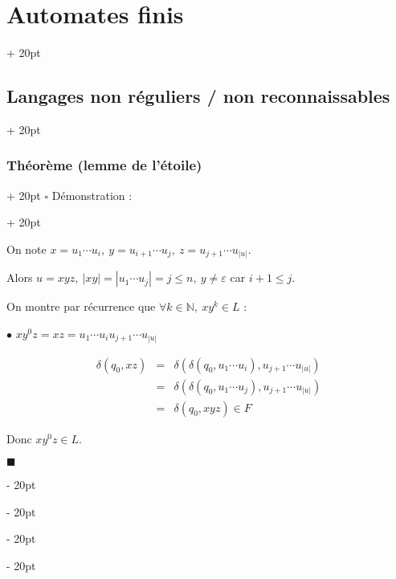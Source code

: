 \documentclass[a4paper, 12pt, twoside]{article}
\newcommand{\N}{\mathbb{N}} %
\newcommand{\abs}[1]{\left\lvert #1 \right\rvert}
\renewcommand{\le}{\leqslant}
\newcommand{\ind}[1][20pt]{\advance\leftskip + #1}
\newcommand{\deind}[1][20pt]{\advance\leftskip - #1}
\newenvironment{indt}[2][20pt]{#2 \par \ind[#1]}{\par \deind} %
\newenvironment{proof}[1][{Démonstration :}]{\begin{indt}{$\square$ #1}}{$\blacksquare$ \end{indt}}
\begin{document}
\begin{indt}{\section{Automates finis}}
\begin{indt}{\subsection{Langages non réguliers / non reconnaissables}}
\begin{indt}{\subsubsection{Théorème (lemme de l'étoile)}}
\begin{proof}
\begin{center}
                    \end{center}

                    On note $x = u_1 \cdots u_i,\ y = u_{i + 1} \cdots u_j,\ z = u_{j + 1} \cdots u_{\abs u}$.

                    Alors $u = xyz,\ \abs{xy} = \abs{u_1 \cdots u_j} = j \le n,\ y \neq \varepsilon$ car $i + 1 \le j$.

                    On montre par récurrence que $\forall k \in \N,\ xy^k \in L$ :

                    \vspace{6pt}
                    
                    $\bullet$ $xy^0z = xz = u_1 \cdots u_i u_{j + 1} \cdots u_{\abs u}$

                    \[
                        \begin{array}{rcl}
                            \delta(q_0, xz)
                            &=& \delta(\delta(q_0, u_1 \cdots u_i), u_{j + 1} \cdots u_{\abs u})
                            \\
                            &=& \delta(\delta(q_0, u_1 \cdots u_j), u_{j + 1} \cdots u_{\abs u})
                            \\
                            &=& \delta(q_0, xyz) \in F
                        \end{array}
                    \]

                    Donc $xy^0 z \in L$.

                    \vspace{6pt}
                    

\end{proof}
\end{indt}
\end{indt}
\end{indt}
\end{document}
